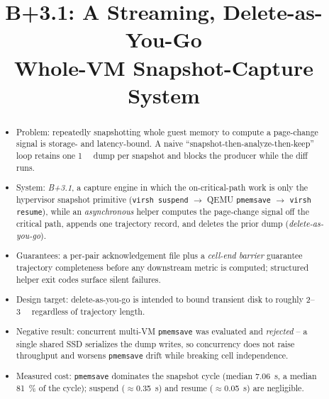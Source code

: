 \documentclass[conference]{IEEEtran}
\title{B+3.1: A Streaming, Delete-as-You-Go\\
Whole-VM Snapshot-Capture System}
\author{\IEEEauthorblockN{TODO Author list}
\IEEEauthorblockA{TODO Affiliation\\
\texttt{TODO@email}}}
\begin{document}
\maketitle

\begin{abstract}
\begin{itemize}
  \item Problem: repeatedly snapshotting whole guest memory to compute a
        page-change signal is storage- and latency-bound. A naive
        ``snapshot-then-analyze-then-keep'' loop retains one \SI{1}{\gibi\byte}
        dump per snapshot and blocks the producer while the diff runs.
  \item System: \emph{B+3.1}, a capture engine in which the on-critical-path
        work is only the hypervisor snapshot primitive (\texttt{virsh suspend}
        $\rightarrow$ QEMU \texttt{pmemsave} $\rightarrow$ \texttt{virsh
        resume}), while an \emph{asynchronous} helper computes the page-change
        signal off the critical path, appends one trajectory record, and
        deletes the prior dump (\emph{delete-as-you-go}).
  \item Guarantees: a per-pair acknowledgement file plus a \emph{cell-end
        barrier} guarantee trajectory completeness before any downstream metric
        is computed; structured helper exit codes surface silent failures.
  \item Design target: delete-as-you-go is intended to bound transient disk to
        roughly \SI{2}{}--\SI{3}{\gibi\byte} regardless of trajectory length.
  \item Negative result: concurrent multi-VM \texttt{pmemsave} was evaluated and
        \emph{rejected} -- a single shared SSD serializes the dump writes, so
        concurrency does not raise throughput and worsens \texttt{pmemsave}
        drift while breaking cell independence.
  \item Measured cost: \texttt{pmemsave} dominates the snapshot cycle (median
        \SI{7.06}{\second}, a median \SI{81}{\percent} of the cycle); suspend
        ($\approx$\SI{0.35}{\second}) and resume ($\approx$\SI{0.05}{\second})
        are negligible.
\end{itemize}
\end{abstract}
\end{document}
